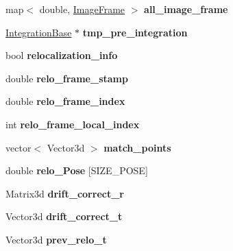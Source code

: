 \begin{DoxyCompactItemize}
\item 
\mbox{\label{classEstimator_ad6a31a9049e505fb4c17ff95211d5531}} 
map$<$ double, \hyperlink{classImageFrame}{Image\+Frame} $>$ {\bfseries all\+\_\+image\+\_\+frame}
\item 
\mbox{\label{classEstimator_aec37f5a60f299724b6b796969fa765f4}} 
\hyperlink{classIntegrationBase}{Integration\+Base} $\ast$ {\bfseries tmp\+\_\+pre\+\_\+integration}
\item 
\mbox{\label{classEstimator_ac40e539f316194131ffe2bf082f82537}} 
bool {\bfseries relocalization\+\_\+info}
\item 
\mbox{\label{classEstimator_a72bb067de7c931a12676bd2730f55f35}} 
double {\bfseries relo\+\_\+frame\+\_\+stamp}
\item 
\mbox{\label{classEstimator_a086049606f6010d07fa9784b87b2b8cf}} 
double {\bfseries relo\+\_\+frame\+\_\+index}
\item 
\mbox{\label{classEstimator_aefda23319479cd02fc65f1868a4c6563}} 
int {\bfseries relo\+\_\+frame\+\_\+local\+\_\+index}
\item 
\mbox{\label{classEstimator_aaaef771460da95bd973293e9d7b07678}} 
vector$<$ Vector3d $>$ {\bfseries match\+\_\+points}
\item 
\mbox{\label{classEstimator_a00de2e0216cf87c7b5d65c49fec4cf3c}} 
double {\bfseries relo\+\_\+\+Pose} \mbox{[}S\+I\+Z\+E\+\_\+\+P\+O\+SE\mbox{]}
\item 
\mbox{\label{classEstimator_af6f0798d2af603a09c33efae290e1ec3}} 
Matrix3d {\bfseries drift\+\_\+correct\+\_\+r}
\item 
\mbox{\label{classEstimator_a922567580fbaaa68dc90a7baa06ec32b}} 
Vector3d {\bfseries drift\+\_\+correct\+\_\+t}
\item 
\mbox{\label{classEstimator_ac847ec23a5024ebbb3a73f3721ee3e47}} 
Vector3d {\bfseries prev\+\_\+relo\+\_\+t}
\item 

\end{DoxyCompactItemize}
